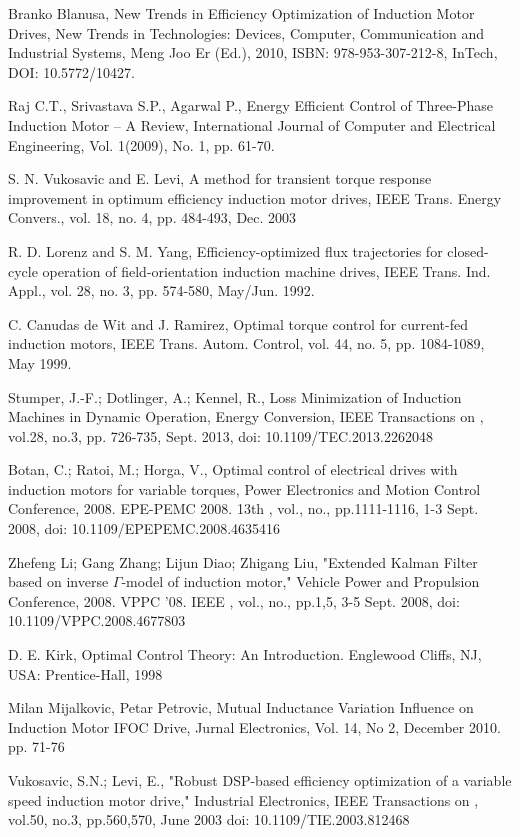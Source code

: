 \documentclass[journal]{IEEEtran}
\begin{document}
\begin{thebibliography}{}

 Branko Blanusa, New Trends in Efficiency Optimization of Induction Motor Drives, New Trends in Technologies: Devices, Computer, Communication and Industrial Systems, Meng Joo Er (Ed.), 2010, ISBN: 978-953-307-212-8, InTech, DOI: 10.5772/10427. 

 Raj C.T., Srivastava S.P., Agarwal P., Energy Efficient Control of Three-Phase Induction Motor -- A Review, International Journal of Computer and Electrical Engineering, Vol. 1(2009), No. 1, pp. 61-70.

 S. N. Vukosavic and E. Levi, A method for transient torque response improvement in optimum efficiency induction motor drives, IEEE Trans.
Energy Convers., vol. 18, no. 4, pp. 484-493, Dec. 2003

 R. D. Lorenz and S. M. Yang, Efficiency-optimized flux trajectories for closed-cycle operation of field-orientation induction machine drives, IEEE Trans. Ind. Appl., vol. 28, no. 3, pp. 574-580, May/Jun. 1992.

 C. Canudas de Wit and J. Ramirez, Optimal torque control for current-fed induction motors, IEEE Trans. Autom. Control, vol. 44, no. 5, pp. 1084-1089, May 1999.

 Stumper, J.-F.; Dotlinger, A.; Kennel, R., Loss Minimization of Induction Machines in Dynamic Operation, Energy Conversion, IEEE Transactions on , vol.28, no.3, pp. 726-735, Sept. 2013, doi: 10.1109/TEC.2013.2262048

 Botan, C.; Ratoi, M.; Horga, V., Optimal control of electrical drives with induction motors for variable torques, Power Electronics and Motion Control Conference, 2008. EPE-PEMC 2008. 13th , vol., no., pp.1111-1116, 1-3 Sept. 2008, doi: 10.1109/EPEPEMC.2008.4635416

 Zhefeng Li; Gang Zhang; Lijun Diao; Zhigang Liu, "Extended Kalman Filter based on inverse $\Gamma$-model of induction motor," Vehicle Power and Propulsion Conference, 2008. VPPC '08. IEEE , vol., no., pp.1,5, 3-5 Sept. 2008, doi: 10.1109/VPPC.2008.4677803

 D. E. Kirk, Optimal Control Theory: An Introduction. Englewood Cliffs, NJ, USA: Prentice-Hall, 1998

 Milan Mijalkovic, Petar Petrovic, Mutual Inductance Variation Influence on Induction Motor IFOC Drive, Jurnal Electronics, Vol. 14, No 2, December 2010. pp. 71-76

 Vukosavic, S.N.; Levi, E., "Robust DSP-based efficiency optimization of a variable speed induction motor drive," Industrial Electronics, IEEE Transactions on , vol.50, no.3, pp.560,570, June 2003
doi: 10.1109/TIE.2003.812468


\end{thebibliography}
\end{document}
